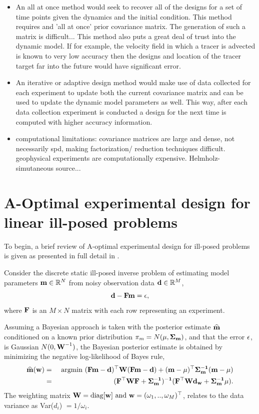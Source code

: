 \documentclass[12pt]{article}
\newcommand {\bfd}   { {\bf d} }
\newcommand {\bfw}   { {\bf w} }
\newcommand {\bfm}   { {\bf m} }
\newcommand {\bfF}  { {\bf F} }
\newcommand{\W}{\text{\bf W}}
\newcommand{\mhat}{\widehat{\bf m}}
\newcommand{\Sig}{\bf \Sigma_m }
\begin{document}
\begin{itemize}
\item An all at once method would seek to recover all of the designs for a set of time points given the dynamics and the initial condition. This method requires and 'all at once' prior covariance matrix. The generation of such a matrix is difficult... This method also puts a great deal of trust into the dynamic model. If for example, the velocity field in which a tracer is advected is known to very low accuracy then the designs and location of the tracer target far into the future would have significant error. 
\item An iterative or adaptive design method would make use of data collected for each experiment to update both the current covariance matrix and can be used to update the dynamic model parameters as well. This way, after each data collection experiment is conducted a design for the next time is computed with higher accuracy information.
\item computational limitations: covariance matrices are large and dense, not necessarily spd, making factorization/ reduction techniques difficult. geophysical experiments are computationally expensive. Helmholz- simutaneous source...

\end{itemize}




\section{A-Optimal experimental design for linear ill-posed problems} 
To begin, a brief review of A-optimal experimental design for ill-posed problems is given as presented in full detail in \cite{habera}. 

\bigskip

Consider the discrete static ill-posed inverse problem of estimating  model parameters $\bfm \in \mathbb{R}^{N}$ from noisy observation data $\bfd \in \mathbb{R}^{M}$,
\begin{equation*}
\bfd - \bfF \bfm = {\bf \epsilon},
\end{equation*} 
where $\bfF$ is an $M \times N$ matrix with each row representing an experiment. 
 
Assuming a Bayesian approach is taken with the posterior estimate  $\mhat$ conditioned on a known prior distribution $\pi_m = N({\bf \mu},\Sig)$, and that the error ${\bf \epsilon}$, is Gaussian $N(0,\W^{-1})$, the Bayesian posterior estimate is obtained by minimizing the negative log-likelihood of Bayes rule,
\begin{eqnarray*}
\mhat(\bfw) &=& \text{ argmin } (\bfF \bfm- \bfd)^{\top} \W(\bfF \bfm- \bfd) + (\bfm-{\bf \mu})^{\top}\Sig^{-1}(\bfm-{\bf \mu})\\
 &=& (\bfF^{\top} \W \bfF + \Sig^{-1})^{-1}(\bfF^{\top} \W \bfd_w + \Sig^{-1}{\bf \mu}).
\end{eqnarray*}     
 The weighting matrix $\W = \text{diag}[\bfw] \text{ and } \bfw = (\omega_1,..,\omega_M)^{\top}$, relates to the data variance as Var($d_{i}$) $=1/\omega_i$. 
\bigskip
\end{document}
